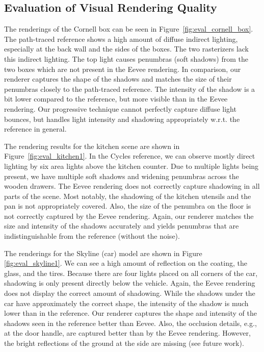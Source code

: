\documentclass[sigconf,authorversion]{acmart}
\begin{document}
\subsection{Evaluation of Visual Rendering Quality}
\label{subsec:rendering_result}
The renderings of the Cornell box can be seen in Figure~\ref{fig:eval_cornell_box}.
The path-traced reference shows a high amount of diffuse indirect lighting, especially at the back wall and the sides of the boxes.
The two rasterizers lack this indirect lighting.
The top light causes penumbras (soft shadows) from the two boxes which are not present in the Eevee rendering.
In comparison, our renderer captures the shape of the shadows and matches the size of their penumbras closely to the path-traced reference.
The intensity of the shadow is a bit lower compared to the reference, but more visible than in the Eevee rendering.
Our progressive technique cannot perfectly capture diffuse light bounces, but handles light intensity and shadowing appropriately w.r.t. the reference in general.

The rendering results for the kitchen scene are shown in Figure~\ref{fig:eval_kitchen1}.
In the Cycles reference, we can observe mostly direct lighting by six area lights above the kitchen counter.
Due to multiple lights being present, we have multiple soft shadows and widening penumbras across the wooden drawers.
The Eevee rendering does not correctly capture shadowing in all parts of the scene.
Most notably, the shadowing of the kitchen utensils and the pan is not appropriately covered.
Also, the size of the penumbra on the floor is not correctly captured by the Eevee rendering.
Again, our renderer matches the size and intensity of the shadows accurately and yields penumbras that are indistinguishable from the reference (without the noise).

The renderings for the Skyline (car) model are shown in Figure \ref{fig:eval_skyline1}.
We can see a high amount of reflection on the coating, the glass, and the tires.
Because there are four lights placed on all corners of the car, shadowing is only present directly below the vehicle.
Again, the Eevee rendering does not display the correct amount of shadowing.
While the shadows under the car have approximately the correct shape, the intensity of the shadow is much lower than in the reference.
Our renderer captures the shape and intensity of the shadows seen in the reference better than Eevee.
Also, the occlusion details, e.g., at the door handle, are captured better than by the Eevee rendering.
However, the bright reflections of the ground at the side are missing (see future work).
\end{document}
